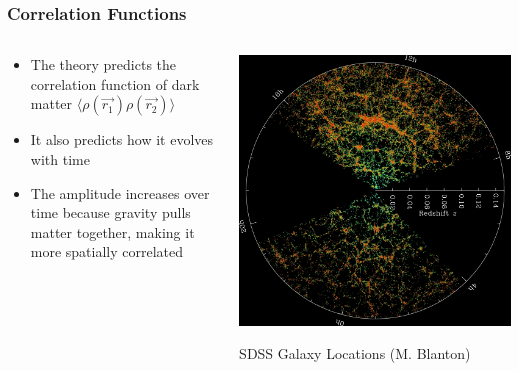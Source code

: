 \documentclass{beamer}
\begin{document}
\frame
{

    \frametitle{Correlation Functions}


    \begin{columns}
        \begin{column}{0.5\textwidth}
            \begin{itemize}

                \item The theory predicts the correlation function of
                    dark matter {\color{gold} $\langle \rho(\vec{r_1}) \rho(\vec{r_2})
                    \rangle$ }

                \item It also predicts how it evolves with time
                    
                \item The amplitude increases over time because gravity pulls
                    matter together, making it more spatially correlated


            \end{itemize}

        \end{column}
        \begin{column}{0.5\textwidth}
            \begin{center}
                \includegraphics[width=\textwidth]{orangepie.jpg}
            \end{center}
            {\tiny SDSS Galaxy Locations (M. Blanton)}
        \end{column}

    \end{columns}


}
\end{document}
